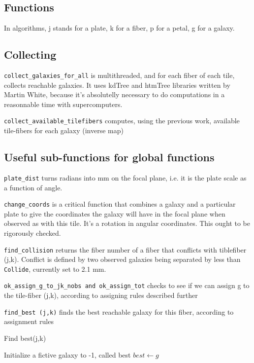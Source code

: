 \documentclass[10pt]{extarticle}
\begin{document}
\begin{multicols}{2}

\section{Functions}
In algorithms, j stands for a plate, k for a fiber, p for a petal, g for a galaxy.

\subsection{Collecting}
{\tt collect\_galaxies\_for\_all} is multithreaded, and for each fiber of each tile, collects reachable galaxies. It uses kdTree and htmTree libraries written by Martin White, because it's absolutelly necessary to do computations in a reasonnable time with supercomputers.

{\tt collect\_available\_tilefibers} computes, using the previous work, available tile-fibers for each galaxy (inverse map)

\subsection{Useful sub-functions for global functions}
{\tt plate\_dist} turns radians into mm on the focal plane, i.e. it is the plate scale as a function of angle.

{\tt change\_coords} is a critical function that combines a galaxy and a particular plate to give the coordinates the galaxy will have in the focal plane when observed as with this tile. It's a rotation in angular coordinates. This ought to be rigorously checked.

{\tt find\_collision} returns the fiber number of a fiber that conflicts with tiblefiber (j,k).  Conflict is defined by two observed galaxies being separated by less than {\tt Collide}, currently set to 2.1 mm.

{\tt ok\_assign\_g\_to\_jk\_nobs and ok\_assign\_tot} checks to see if we can assign g to the tile-fiber (j,k), according to assigning rules described further

{\tt find\_best (j,k)} finds the best reachable galaxy for this fiber, according to assignment rules

\begin{algorithm}[H]
	\caption{Find best(j,k)}\label{euclid}
	\begin{algorithmic}[1]
		\State Initialize a fictive galaxy to -1, called best
		\State $best \gets g$
		\EndIf
		\EndFor
	\end{algorithmic}
\end{algorithm}


\end{multicols}
\end{document}
